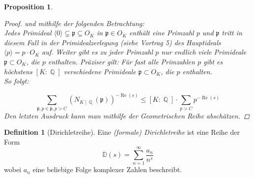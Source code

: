 \documentclass[10pt,a4paper]{article}
\theoremstyle{plain}
\newtheorem{prop}[thm]{Proposition}
\theoremstyle{definition}
\newtheorem{defn}{Definition}[section]
\theoremstyle{remark}
\DeclareMathOperator{\Q}{\mathbb{Q}}
\DeclareMathOperator{\re}{Re}
\begin{document}
\begin{prop}
\begin{proof}
und mithilfe der folgenden Betrachtung: \\Jedes Primideal $\langle0\rangle\subsetneq \mathfrak{p} \subseteq O_{\textit{K}}$ in $\mathfrak{p} \in O_K$ enthält eine Primzahl $p$ und $\mathfrak{p}$ tritt in diesem Fall in der Primidealzerlegung (siehe Vortrag 5) des Hauptideals $\langle p \rangle=p\cdot O_K$ auf. Weiter gibt es zu jeder Primzahl $p$ nur endlich viele Primideale $\mathfrak{p}\subset O_K$, die $p$ enthalten. Präziser gilt: Für fast alle Primzahlen $p$ gibt es höchstens $[K\colon \Q]$ verschiedene Primideale $\mathfrak{p}\subset O_K$, die $p$ enthalten. 
\\
So folgt:

$$\sum_{\mathfrak{p},p\in \mathfrak{p},p>C}(N_{K\mid \Q}(\mathfrak{p}))^{-\re(s)} \leq [K\colon\Q]\cdot \sum_{p>C}p^{-\re(s)} $$Den letzten Ausdruck kann man mithilfe der Geometrischen Reihe abschätzen.
\end{proof}
\end{prop}


\begin{defn}[Dirichletreihe]

Eine \textit{(formale) Dirichletreihe} ist eine Reihe der Form $$\mathbb{D}(s) = \sum_{n =1}^{\infty}\frac{a_n}{n^s} $$ wobei $a_n$ eine beliebige Folge komplexer Zahlen beschreibt.

\end{defn}
\end{document}
